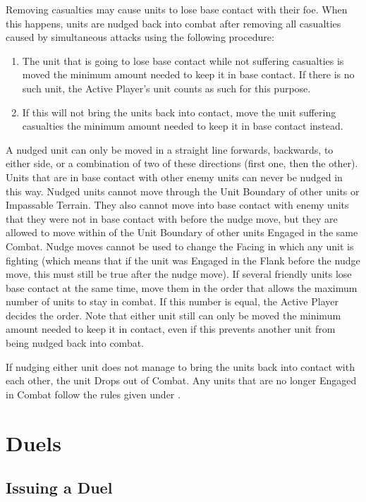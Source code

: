 Removing casualties may cause units to lose base contact with their foe. When this happens, units are nudged back into combat after removing all casualties caused by simultaneous attacks using the following procedure:
\begin{enumerate}
	\item The unit that is going to lose base contact while not suffering casualties is moved the minimum amount needed to keep it in base contact. If there is no such unit, the Active Player's unit counts as such for this purpose.
	\item If this will not bring the units back into contact, move the unit suffering casualties the minimum amount needed to keep it in base contact instead.
\end{enumerate}
A nudged unit can only be moved in a straight line forwards, backwards, to either side, or a combination of two of these directions (first one, then the other). Units that are in base contact with other enemy units can never be nudged in this way. Nudged units cannot move through the Unit Boundary of other units or Impassable Terrain. They also cannot move into base contact with enemy units that they were not in base contact with before the nudge move, but they are allowed to move within  of the Unit Boundary of other units Engaged in the same Combat. Nudge moves cannot be used to change the Facing in which any unit is fighting (which means that if the unit was Engaged in the Flank before the nudge move, this must still be true after the nudge move). If several friendly units lose base contact at the same time, move them in the order that allows the maximum number of units to stay in combat. If this number is equal, the Active Player decides the order. Note that either unit still can only be moved the minimum amount needed to keep it in contact, even if this prevents another unit from being nudged back into combat.\par

If nudging either unit does not manage to bring the units back into contact with each other, the unit Drops out of Combat. Any units that are no longer Engaged in Combat follow the rules given under .
\par

\section{Duels}
\label{duels}

\subsection{Issuing a Duel}
\label{issuing_a_duel}

